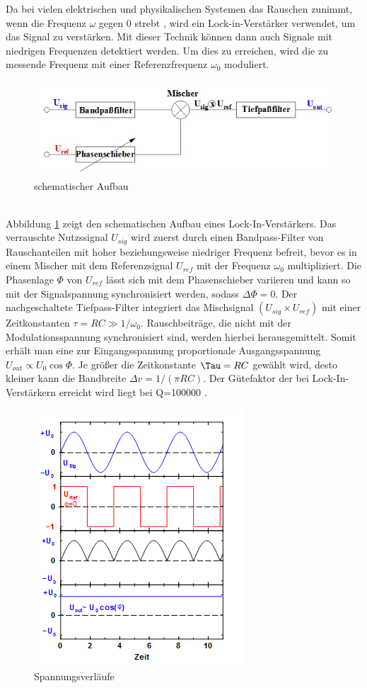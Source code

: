 Da bei vielen elektrischen und physikalischen Systemen das Rauschen zunimmt, wenn
die Frequenz $\omega$ gegen 0 strebt \cite{enet}, wird ein Lock-in-Verstärker
verwendet, um das Signal zu verstärken. Mit dieser Technik können dann auch
Signale mit niedrigen Frequenzen detektiert werden. Um dies zu erreichen, wird die
zu messende Frequenz mit einer Referenzfrequenz $\omega_0$ moduliert. \\
\begin{figure}[h]
  \includegraphics{Bilder/Schema.jpeg}
  \caption{schematischer Aufbau}
  \label{fig:schema}
\end{figure} \\
Abbildung \ref{fig:schema} zeigt den schematischen Aufbau eines Lock-In-Verstärkers.
Das verrauschte Nutzssignal $U_{sig}$ wird zuerst durch einen Bandpass-Filter
von Rauschanteilen mit hoher beziehungsweise niedriger Frequenz befreit, bevor
es in einem Mischer mit dem Referenzsignal $U_{ref}$ mit der Frequenz $\omega_0$
multipliziert. Die Phasenlage $\Phi$ von $U_{ref}$ lässt sich mit dem
Phasenschieber variieren und kann so mit der Signalspannung synchronisiert werden,
sodass $\Delta\Phi =0$.
Der nachgeschaltete Tiefpass-Filter integriert das Mischsignal $(U_{sig}\times U_{ref})$
mit einer Zeitkonstanten $\tau = RC \gg 1/\omega_0$.
Rauschbeiträge, die nicht mit der Modulationsspannung synchronisiert sind, werden
hierbei herausgemittelt. Somit erhält man eine zur Eingangsspannung proportionale
Ausgangsspannung $U_{out} \propto U_0 \cos{\Phi}$.
Je größer die Zeitkonstante $\Tau =RC$ gewählt wird, desto kleiner kann die
Bandbreite $\Delta v=1/(\pi RC)$.
Der Gütefaktor der bei Lock-In-Verstärkern erreicht wird liegt bei Q=100000
\cite{303}. \\
\begin{figure}[p]
  \includegraphics{Bilder/Spannung.jpeg}
  \caption{Spannungsverläufe}
  \label{fig:spannung}
\end{figure}
